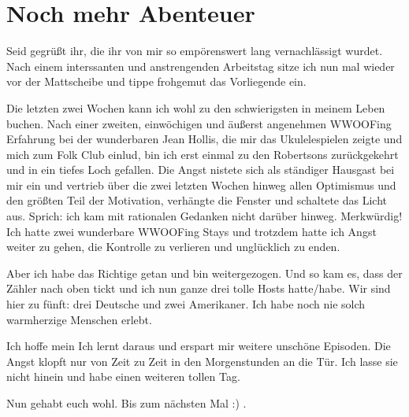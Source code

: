 \chapter{Noch mehr Abenteuer}

Seid gegrüßt ihr, die ihr von mir so empörenswert lang vernachlässigt
wurdet. Nach einem interssanten und anstrengenden Arbeitstag sitze ich
nun mal wieder vor der Mattscheibe und tippe frohgemut das Vorliegende
ein.

Die letzten zwei Wochen kann ich wohl zu den schwierigsten in meinem
Leben buchen. Nach einer zweiten, einwöchigen und äußerst angenehmen
WWOOFing Erfahrung bei der wunderbaren Jean Hollis, die mir das
Ukulelespielen zeigte und mich zum Folk Club einlud, bin ich erst einmal
zu den Robertsons zurückgekehrt und in ein tiefes Loch gefallen. Die
Angst nistete sich als ständiger Hausgast bei mir ein und vertrieb über
die zwei letzten Wochen hinweg allen Optimismus und den größten Teil der
Motivation, verhängte die Fenster und schaltete das Licht aus. Sprich:
ich kam mit rationalen Gedanken nicht darüber hinweg. Merkwürdig! Ich
hatte zwei wunderbare WWOOFing Stays und trotzdem hatte ich Angst weiter
zu gehen, die Kontrolle zu verlieren und unglücklich zu enden.

Aber ich habe das Richtige getan und bin weitergezogen. Und so kam es,
dass der Zähler nach oben tickt und ich nun ganze drei tolle Hosts
hatte/habe. Wir sind hier zu fünft: drei Deutsche und zwei Amerikaner.
Ich habe noch nie solch warmherzige Menschen erlebt.

Ich hoffe mein Ich lernt daraus und erspart mir weitere unschöne
Episoden. Die Angst klopft nur von Zeit zu Zeit in den Morgenstunden an
die Tür. Ich lasse sie nicht hinein und habe einen weiteren tollen Tag.

Nun gehabt euch wohl. Bis zum nächsten Mal :) .
